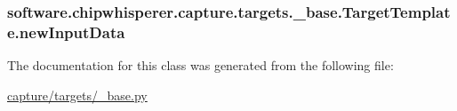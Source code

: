 \hypertarget{classsoftware_1_1chipwhisperer_1_1capture_1_1targets_1_1__base_1_1TargetTemplate_ad88478f3ee338f099b8f4a8aa1d3415f}{}
\subsubsection[{new\+Input\+Data}]{\setlength{\rightskip}{0pt plus 5cm}software.\+chipwhisperer.\+capture.\+targets.\+\_\+base.\+Target\+Template.\+new\+Input\+Data}\label{classsoftware_1_1chipwhisperer_1_1capture_1_1targets_1_1__base_1_1TargetTemplate_ad88478f3ee338f099b8f4a8aa1d3415f}


The documentation for this class was generated from the following file\+:\begin{DoxyCompactItemize}
\item 
\hyperlink{capture_2targets_2__base_8py}{capture/targets/\+\_\+base.\+py}\end{DoxyCompactItemize}
